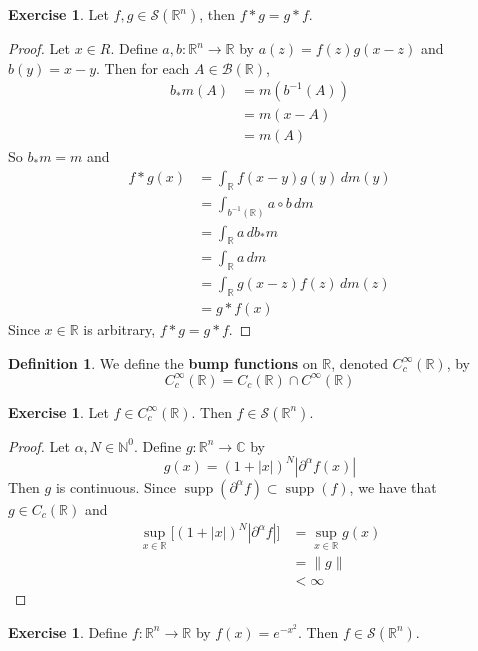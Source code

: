 \documentclass[12pt]{amsart}
\theoremstyle{definition}
\newtheorem{defn}[definition]{Definition}
\newtheorem{ex}[definition]{Exercise}
\DeclareMathOperator{\supp}{supp}
\newcommand{\p}{\partial}
\newcommand{\al}{\alpha}
\newcommand{\C}{\mathbb{C}}
\newcommand{\N}{\mathbb{N}}
\newcommand{\R}{\mathbb{R}}
\newcommand{\MB}{\mathcal{B}}
\newcommand{\MS}{\mathcal{S}}
\newcommand{\dm}{\, d m}
\begin{document}
	\begin{ex}
		Let $f, g \in \MS(\R^n)$, then $f*g = g*f$.
	\end{ex}

	\begin{proof}
		Let $x \in R$. Define $a,b:\R^n \rightarrow \R$ by $a(z) = f(z)g(x-z)$ and $b(y) = x-y$. Then for each $A \in \MB(\R)$, 
		\begin{align*}
			b_*m(A)
			& = m(b^{-1}(A)) \\
			& = m(x - A) \\
			& = m(A)
		\end{align*}
		So $b_*m = m$ and  
		\begin{align*}
			f*g(x)
			& = \int_{\R} f(x-y)g(y) \dm(y) \\
			& = \int_{b^{-1}(\R)} a \circ b \dm \\
			& = \int_{\R} a \, d b_*m \\
			& = \int_{\R} a \dm \\
			& = \int_{\R} g(x-z) f(z) \dm(z) \\
			& = g*f(x)
		\end{align*}
		Since $x \in \R$ is arbitrary, $f*g = g*f$.
	\end{proof}

	\begin{defn}
		We define the \textbf{bump functions} on $\R$, denoted $C_c^{\infty}(\R)$,  by $$C_c^{\infty}(\R) = C_c(\R) \cap C^{\infty}(\R)$$
	\end{defn}

	\begin{ex}
		Let $f \in C_c^{\infty}(\R)$. Then $f \in \MS(\R^n)$. 
	\end{ex}

	\begin{proof}
		Let $\al,N \in \N^0$. Define $g: \R^n \rightarrow \C$ by 
		$$g(x) = (1+|x|)^N |\p^{\al}f(x)|$$ 
		Then $g$ is continuous. Since $\supp(\p^{\al}f) \subset \supp(f)$, we have that $g \in C_c(\R)$ and
		\begin{align*}
			\sup_{x \in \R} \bigg[ (1+|x|)^N |\p^{\al}f|\bigg] 
			& = \sup_{x \in \R} g(x) \\
			& = \|g\| \\
			& < \infty
		\end{align*}
	\end{proof}

	\begin{ex}
		Define $f:\R^n \rightarrow \R$ by $f(x) = e^{-x^2}$. Then $f \in \MS(\R^n)$.
	\end{ex}
	
\end{document}
